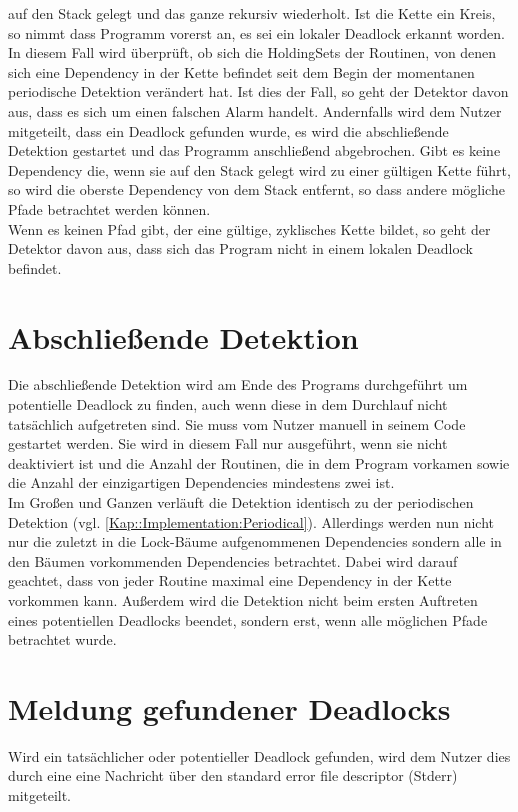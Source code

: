 auf den Stack gelegt und das ganze rekursiv wiederholt. Ist die Kette ein Kreis,
so nimmt dass Programm vorerst an, es sei ein lokaler Deadlock erkannt worden.
In diesem Fall wird überprüft, ob sich die HoldingSets der Routinen, von denen
sich eine Dependency in der Kette befindet seit dem Begin der momentanen 
periodische Detektion verändert hat. Ist dies der Fall, so geht der Detektor
 davon aus, dass es sich um einen falschen Alarm handelt. Andernfalls 
wird dem Nutzer mitgeteilt, dass ein Deadlock gefunden wurde, es wird die 
abschließende Detektion gestartet und das Programm anschließend abgebrochen.
Gibt es keine Dependency die, wenn sie auf den Stack gelegt wird zu einer 
gültigen Kette führt, so wird die oberste Dependency von dem Stack entfernt,
so dass andere mögliche Pfade betrachtet werden können.\\
Wenn es keinen Pfad gibt, der eine gültige, zyklisches Kette bildet, so geht 
der Detektor davon aus, dass sich das Program nicht in einem lokalen Deadlock
befindet.

\section{Abschließende Detektion}
Die abschließende Detektion wird am Ende des Programs durchgeführt um 
potentielle Deadlock zu finden, auch wenn diese in dem Durchlauf nicht 
tatsächlich aufgetreten sind. Sie muss vom Nutzer manuell in seinem Code 
gestartet werden. Sie wird in diesem Fall nur ausgeführt, wenn sie nicht 
deaktiviert ist und
 die Anzahl der Routinen, die in dem Program vorkamen 
sowie die Anzahl der einzigartigen Dependencies mindestens zwei ist.\\
Im Großen und Ganzen verläuft die Detektion 
identisch zu der periodischen Detektion (vgl. \ref{Kap::Implementation:Periodical}).
Allerdings werden nun nicht nur die zuletzt in die Lock-Bäume aufgenommenen 
Dependencies sondern alle in den Bäumen vorkommenden Dependencies betrachtet. 
Dabei wird darauf geachtet, dass von jeder Routine maximal eine 
Dependency in der Kette vorkommen kann. Außerdem wird die Detektion nicht beim 
ersten Auftreten eines potentiellen Deadlocks beendet, sondern erst, wenn alle 
möglichen Pfade betrachtet wurde.


\section{Meldung gefundener Deadlocks}\label{Kap::Implementation:Report}
Wird ein tatsächlicher oder potentieller Deadlock gefunden, wird dem Nutzer 
dies durch eine eine Nachricht über den standard error file descriptor (Stderr)
mitgeteilt.
